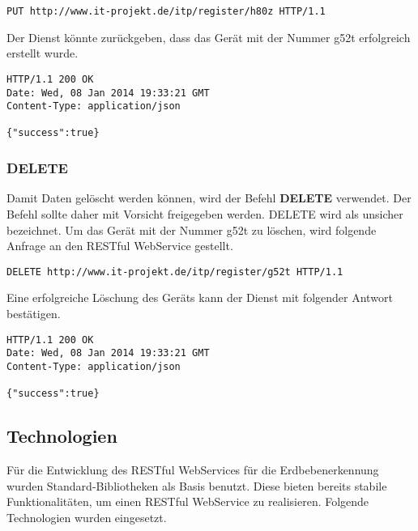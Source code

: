 \begin{lstlisting}[caption={Beispiel HTTP PUT Anfrage bei RESTful WebServices}]
PUT http://www.it-projekt.de/itp/register/h80z HTTP/1.1
\end{lstlisting} 

Der Dienst könnte zurückgeben, dass das Gerät mit der Nummer \dq{}g52t\dq{} erfolgreich erstellt wurde.

\begin{lstlisting}[caption={Beispiel Antwort auf die HTTP PUT Anfrage}]
HTTP/1.1 200 OK
Date: Wed, 08 Jan 2014 19:33:21 GMT
Content-Type: application/json

{"success":true}
\end{lstlisting} 

\subsubsection{DELETE}
Damit Daten gelöscht werden können, wird der Befehl \textbf{DELETE} verwendet. Der Befehl sollte daher mit Vorsicht freigegeben werden. DELETE wird als unsicher bezeichnet. Um das Gerät mit der Nummer \dq{}g52t\dq{} zu löschen, wird folgende Anfrage an den RESTful WebService gestellt.

\begin{lstlisting}[caption={Beispiel HTTP DELETE Anfrage bei RESTful WebServices}]
DELETE http://www.it-projekt.de/itp/register/g52t HTTP/1.1
\end{lstlisting} 

Eine erfolgreiche Löschung des Geräts kann der Dienst mit folgender Antwort bestätigen.

\begin{lstlisting}[caption={Beispiel Antwort auf die HTTP DELETE Anfrage}]
HTTP/1.1 200 OK
Date: Wed, 08 Jan 2014 19:33:21 GMT
Content-Type: application/json

{"success":true}
\end{lstlisting} 

\subsection{Technologien}
Für die Entwicklung des RESTful WebServices für die Erdbebenerkennung wurden Standard-Bibliotheken als Basis benutzt. Diese bieten bereits stabile Funktionalitäten, um einen RESTful WebService zu realisieren. Folgende Technologien wurden eingesetzt.


